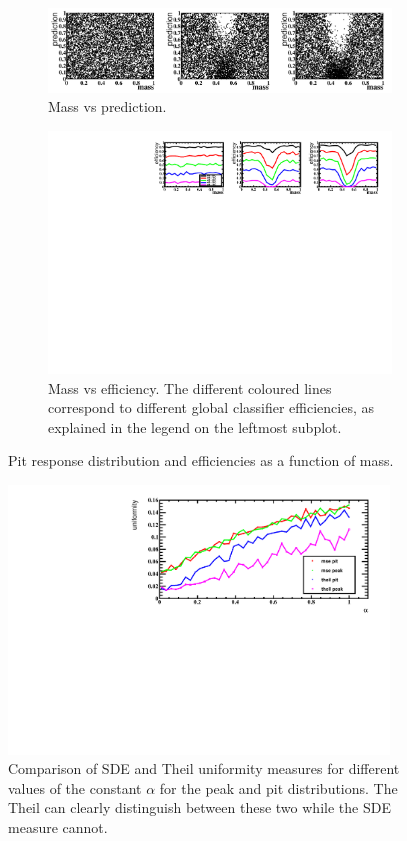 \begin{figure}[h]
\centering
		\begin{subfigure}[b]{0.95\textwidth}
			\includegraphics[width=\textwidth]{graphs/PitDistributions.png}
			\caption{Mass vs prediction.}
		\end{subfigure}
		\begin{subfigure}[b]{0.95\textwidth}
			\includegraphics[width=\textwidth]{graphs/PitEffs.pdf}
			\caption{Mass vs efficiency. The different coloured lines correspond to
				different global classifier efficiencies, as explained in the legend on the leftmost subplot.}
		\end{subfigure}
		\caption{Pit response distribution and efficiencies as a function of mass. \label{fig:pitdists}}
\end{figure}

\begin{figure}[h]
\centering
	\includegraphics[width=0.9\textwidth]{graphs/TheilVsMSE.pdf}
	\caption{Comparison of SDE and Theil uniformity measures for different values of the constant $\alpha$ for the peak and pit distributions.
The Theil can clearly distinguish between these two while the SDE measure cannot.}
\end{figure}

